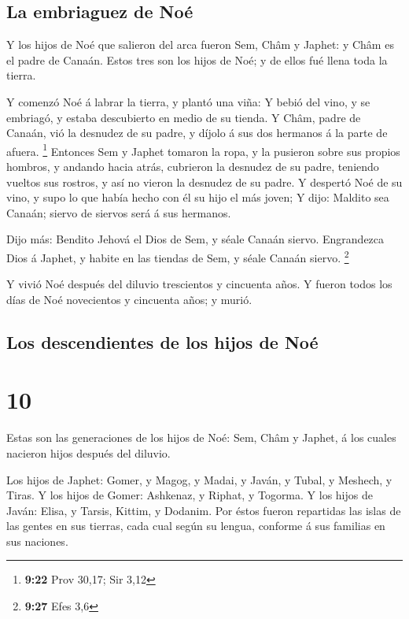\hypertarget{la-embriaguez-de-nouxe9}{%
\subsection{La embriaguez de Noé}\label{la-embriaguez-de-nouxe9}}

 Y los hijos de Noé que salieron del arca fueron Sem,
Châm y Japhet: y Châm es el padre de Canaán.  Estos tres
son los hijos de Noé; y de ellos fué llena toda la tierra.

 Y comenzó Noé á labrar la tierra, y plantó una viña:
 Y bebió del vino, y se embriagó, y estaba descubierto en
medio de su tienda.  Y Châm, padre de Canaán, vió la
desnudez de su padre, y díjolo á sus dos hermanos á la parte de afuera.
\footnote{\textbf{9:22} Prov 30,17; Sir 3,12}  Entonces
Sem y Japhet tomaron la ropa, y la pusieron sobre sus propios hombros, y
andando hacia atrás, cubrieron la desnudez de su padre, teniendo vueltos
sus rostros, y así no vieron la desnudez de su padre.  Y
despertó Noé de su vino, y supo lo que había hecho con él su hijo el más
joven;  Y dijo: Maldito sea Canaán; siervo de siervos
será á sus hermanos.

 Dijo más: Bendito Jehová el Dios de Sem, y séale Canaán
siervo.  Engrandezca Dios á Japhet, y habite en las
tiendas de Sem, y séale Canaán siervo. \footnote{\textbf{9:27} Efes 3,6}

 Y vivió Noé después del diluvio trescientos y cincuenta
años.  Y fueron todos los días de Noé novecientos y
cincuenta años; y murió.

\hypertarget{los-descendientes-de-los-hijos-de-nouxe9}{%
\subsection{Los descendientes de los hijos de
Noé}\label{los-descendientes-de-los-hijos-de-nouxe9}}

\hypertarget{section-9}{%
\section{10}\label{section-9}}

 Estas son las generaciones de los hijos de Noé: Sem, Châm
y Japhet, á los cuales nacieron hijos después del diluvio.

 Los hijos de Japhet: Gomer, y Magog, y Madai, y Javán, y
Tubal, y Meshech, y Tiras.  Y los hijos de Gomer:
Ashkenaz, y Riphat, y Togorma.  Y los hijos de Javán:
Elisa, y Tarsis, Kittim, y Dodanim.  Por éstos fueron
repartidas las islas de las gentes en sus tierras, cada cual según su
lengua, conforme á sus familias en sus naciones.

